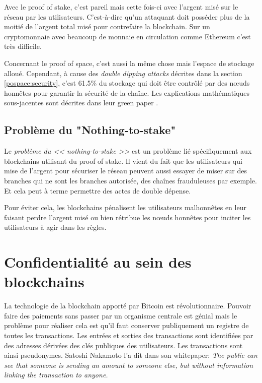 Avec le proof of stake, c'est pareil mais cette fois-ci avec l'argent misé sur le réseau par les utilisateurs. C'est-à-dire qu'un attaquant doit posséder plus de la moitié de l'argent total misé pour contrefaire la blockchain. Sur un cryptomonnaie avec beaucoup de monnaie en circulation comme Ethereum c'est très difficile.

Concernant le proof of space, c'est aussi la même chose mais l'espace de stockage alloué. Cependant, à cause des \emph{double dipping attacks} décrites dans la section \ref{pospace:security}, c'est 61.5\% du stockage qui doit être contrôlé par des nœuds honnêtes pour garantir la sécurité de la chaîne. Les explications mathématiques sous-jacentes sont décrites dans leur green paper \cite{chia:greenpaper}.

\subsection{Problème du "Nothing-to-stake"}

Le \emph{problème du << nothing-to-stake >>} est un problème lié spécifiquement aux blockchains utilisant du proof of stake. Il vient du fait que les utilisateurs qui mise de l'argent pour sécuriser le réseau peuvent aussi essayer de miser sur des branches qui ne sont les branches autorisée, des chaînes frauduleuses par exemple. Et cela peut à terme permettre des actes de double dépense.

Pour éviter cela, les blockchains pénalisent les utilisateurs malhonnêtes en leur faisant perdre l'argent misé ou bien rétribue les nœuds honnêtes pour inciter les utilisateurs à agir dans les règles.

\section{Confidentialité au sein des blockchains}

La technologie de la blockchain apporté par Bitcoin est révolutionnaire. Pouvoir faire des paiements sans passer par un organisme centrale est génial mais le problème pour réaliser cela est qu'il faut conserver publiquement un registre de toutes les transactions. Les entrées et sorties des transactions sont identifiées par des adresses dérivées des clés publiques des utilisateurs. Les transactions sont ainsi pseudonymes. Satoshi Nakamoto l'a dit dans son whitepaper: \textit{The public can see that someone is sending an amount to someone else, but without information linking the transaction to anyone.}

